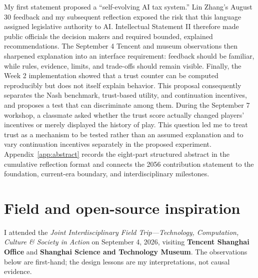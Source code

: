 My first statement proposed a ``self-evolving AI tax system.'' Lin Zhang's August 30 feedback and my subsequent reflection exposed the risk that this language assigned legislative authority to AI. Intellectual Statement II therefore made public officials the decision makers and required bounded, explained recommendations. The September 4 Tencent and museum observations then sharpened explanation into an interface requirement: feedback should be familiar, while rules, evidence, limits, and trade-offs should remain visible. Finally, the Week 2 implementation showed that a trust counter can be computed reproducibly but does not itself explain behavior. This proposal consequently separates the Nash benchmark, trust-based utility, and continuation incentives, and proposes a test that can discriminate among them. During the September 7 workshop, a classmate asked whether the trust score actually changed players' incentives or merely displayed the history of play. This question led me to treat trust as a mechanism to be tested rather than an assumed explanation and to vary continuation incentives separately in the proposed experiment.
Appendix~\ref{app:abstract} records the eight-part structured abstract in the cumulative reflection format and connects the 2056 contribution statement to the foundation, current-era boundary, and interdisciplinary milestones.

\section{Field and open-source inspiration}
I attended the \emph{Joint Interdisciplinary Field Trip---Technology, Computation, Culture \& Society in Action} on September 4, 2026, visiting \textbf{Tencent Shanghai Office} and \textbf{Shanghai Science and Technology Museum}. The observations below are first-hand; the design lessons are my interpretations, not causal evidence.


